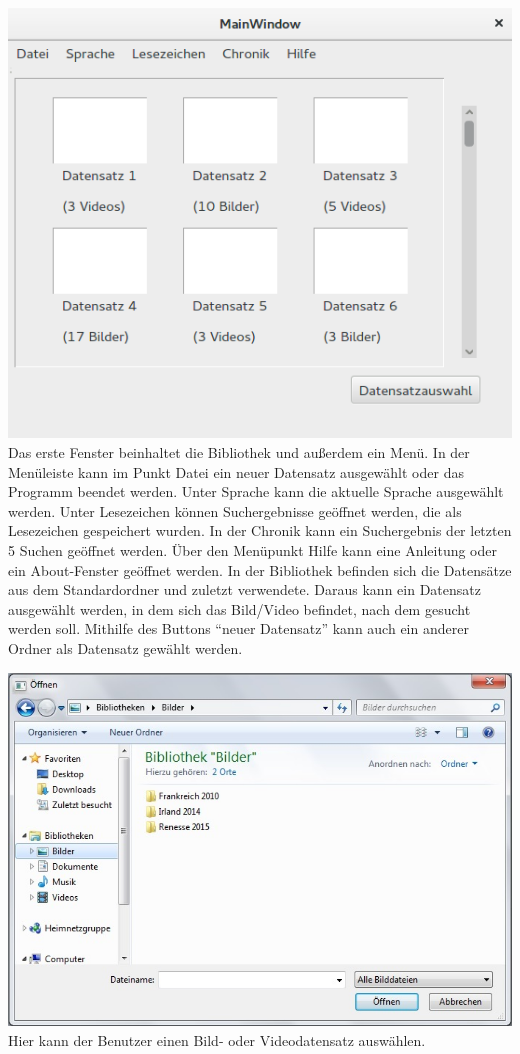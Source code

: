 \includegraphics[width=1\linewidth]{img/Bibliothek}
Das erste Fenster beinhaltet die Bibliothek und außerdem ein Menü. In der Menüleiste kann im Punkt Datei ein neuer Datensatz ausgewählt oder das Programm beendet werden.  Unter Sprache kann die aktuelle Sprache ausgewählt werden. Unter Lesezeichen können Suchergebnisse geöffnet werden, die als Lesezeichen gespeichert wurden. In der Chronik kann ein Suchergebnis der letzten 5 Suchen geöffnet werden. Über den Menüpunkt Hilfe kann eine Anleitung oder ein About-Fenster geöffnet werden.
In der Bibliothek befinden sich die Datensätze aus dem Standardordner und zuletzt verwendete. Daraus kann ein Datensatz ausgewählt werden, in dem sich das Bild/Video befindet, nach dem gesucht werden soll. Mithilfe des Buttons \enquote{neuer Datensatz} kann auch ein anderer Ordner als Datensatz gewählt werden.

\includegraphics[width=1\linewidth]{img/FileChooser}
Hier kann der Benutzer einen Bild- oder Videodatensatz auswählen.

